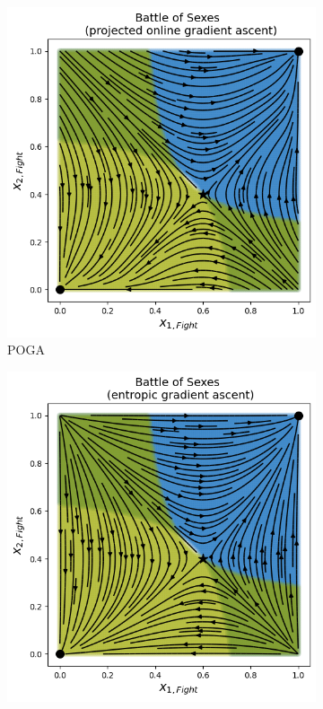 \begin{figure}[H]
\captionsetup{justification=centering}
\centering
\begin{subfigure}{.5\textwidth}
    \centering
    \includegraphics[width=\textwidth]{logos/BattleOfSexes1.png}
    \caption{POGA}
\end{subfigure}%
\begin{subfigure}{.5\textwidth}
    \centering
    \includegraphics[width=\textwidth]{logos/BattleOfSexes2.png}

\end{subfigure}
\end{figure}
